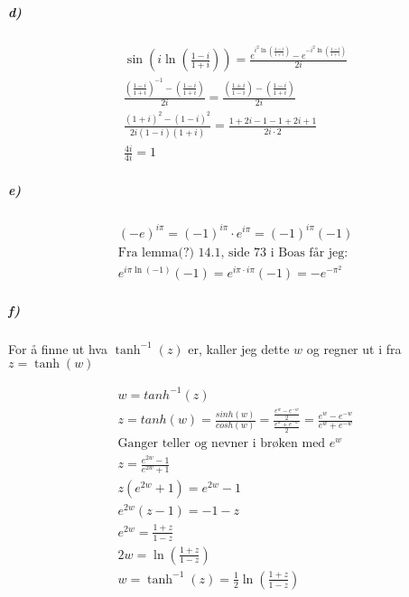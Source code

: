 \documentclass[11pt, A4paper, norsk]{article}
\begin{document}
			\subparagraph{d)}
				\begin{gather}
\sin\left( i \ln\left( \frac{1 - i}{1 + i} \right) \right) = \frac{e^{i^{2} \ln\left(\frac{1 - i}{1 + i}\right)} - e^{- i^{2} \ln\left(\frac{1 - i}{1 + i}\right)}}{2i} \\
\frac{\left(\frac{1 - i}{1 + i}\right)^{-1} - \left(\frac{1 - i}{1 + i}\right)}{2i} = \frac{\left(\frac{1 + i}{1 - i}\right) - \left(\frac{1 - i}{1 + i}\right)}{2i} \\
\frac{\left( 1 + i \right)^{2} - \left( 1 - i \right)^{2}}{2i \left( 1 - i \right) \left( 1 + i \right)} = \frac{1 + 2i - 1 - 1 + 2i + 1}{2i \cdot 2} \\
\frac{4i}{4i} = 1
				\end{gather}









			\subparagraph{e)}
				\begin{gather}
\left( -e \right)^{i\pi} = (-1)^{i\pi} \cdot e^{i\pi} = (-1)^{i\pi} (-1) \\
\text{Fra lemma(?) 14.1, side 73 i Boas får jeg:} \nonumber \\
e^{i\pi \ln(-1)} (-1) = e^{i\pi \cdot i\pi} (-1) = -e^{-\pi^{2}}
				\end{gather}










			\subparagraph{f)}
				\begin{flushleft}
For å finne ut hva $\tanh^{-1}(z)$ er, kaller jeg dette $w$ og regner ut i fra $z = \tanh(w)$
				\end{flushleft}
				\begin{gather}
w = tanh^{-1}(z) \\
z = tanh(w) = \frac{sinh(w)}{cosh(w)} = \frac{\frac{e^{w} - e^{-w}}{2}}{\frac{e^{w} + e^{-w}}{2}} = \frac{e^{w} - e^{-w}}{e^{w} + e^{-w}} \\
\text{Ganger teller og nevner i brøken med $e^{w}$} \nonumber \\
z = \frac{e^{2w} - 1}{e^{2w} + 1} \\
z \left( e^{2w} + 1 \right) = e^{2w} - 1 \\
e^{2w}(z - 1) = -1 - z \\
e^{2w} = \frac{1 + z}{1 - z} \\
2w = \ln\left( \frac{1 + z}{1 - z} \right) \\
w = \tanh^{-1}(z) = \frac{1}{2} \ln\left( \frac{1 + z}{1 - z} \right)
				\end{gather}
\end{document}
